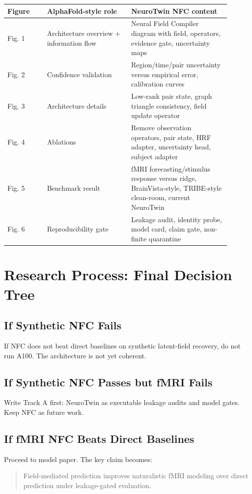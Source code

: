 \documentclass[11pt]{article}
\begin{document}
\begin{longtable}{p{0.16\linewidth}p{0.34\linewidth}p{0.40\linewidth}}
\toprule
Figure & AlphaFold-style role & NeuroTwin NFC content \\
\midrule
Fig. 1 & Architecture overview + information flow & Neural Field Compiler diagram with field, operators, evidence gate, uncertainty maps \\
Fig. 2 & Confidence validation & Region/time/pair uncertainty versus empirical error, calibration curves \\
Fig. 3 & Architecture details & Low-rank pair state, graph triangle consistency, field update operator \\
Fig. 4 & Ablations & Remove observation operators, pair state, HRF adapter, uncertainty head, subject adapter \\
Fig. 5 & Benchmark result & fMRI forecasting/stimulus response versus ridge, BrainVista-style, TRIBE-style clean-room, current NeuroTwin \\
Fig. 6 & Reproducibility gate & Leakage audit, identity probe, model card, claim gate, non-finite quarantine \\
\bottomrule
\end{longtable}

\section{Research Process: Final Decision Tree}

\subsection{If Synthetic NFC Fails}
If NFC does not beat direct baselines on synthetic latent-field recovery, do not run A100. The architecture is not yet coherent.

\subsection{If Synthetic NFC Passes but fMRI Fails}
Write Track A first: NeuroTwin as executable leakage audits and model gates. Keep NFC as future work.

\subsection{If fMRI NFC Beats Direct Baselines}
Proceed to model paper. The key claim becomes:
\begin{quote}
Field-mediated prediction improves naturalistic fMRI modeling over direct prediction under leakage-gated evaluation.
\end{quote}
\end{document}
